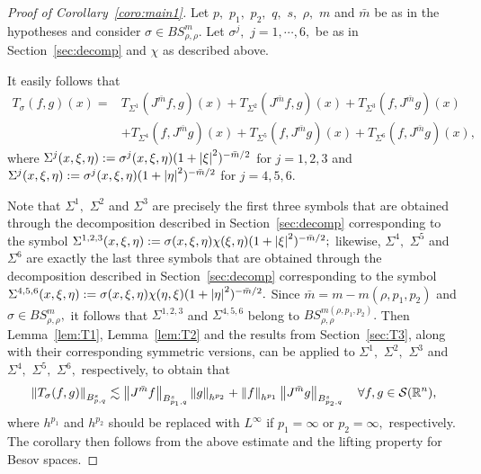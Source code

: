\begin{proof}[Proof of Corollary~\ref{coro:main1}]
 Let $p,$ $p_1,$ $p_2,$ $q,$ $s,$ $\rho,$ $m$  and $\bar{m}$ be as in the hypotheses and consider $\sigma\in BS^m_{\rho,\rho}.$  Let $\sigma^j,$ $j=1,\cdots,6,$  be as in Section~\ref{sec:decomp} and $\chi$ as described above. 

It easily follows that
\begin{align*}
T_{\sigma}(f,g)(x)=&T_{\Sigma^1}(J^{\bar{m}}f, g)(x) +T_{\Sigma^2} (J^{\bar{m}}f, g)(x) + T_{\Sigma^3}(f,J^{\bar{m}}g)(x)\\ &+T_{\Sigma^4} (f, J^{\bar{m}}g)(x)+T_{\Sigma^5} (f, J^{\bar{m}}g)(x)+T_{\Sigma^6} (f, J^{\bar{m}}g)(x), 
\end{align*}
where $\Sigma^j(x,\xi,\eta):=\sigma^j(x,\xi,\eta)(1+\left\vert \xi \right\vert^2)^{-\bar{m}/2}$ for $j=1,2,3$ and  $\Sigma^j(x,\xi,\eta):=\sigma^j(x,\xi,\eta)(1+\left\vert \eta \right\vert^2)^{-\bar{m}/2}$ for $j=4,5,6.$

 Note that $\Sigma^1,$ $\Sigma^2$ and $\Sigma^3$ are precisely  the first three symbols that are obtained through the decomposition described in Section~\ref{sec:decomp} corresponding to the symbol $\Sigma^{1,2,3}(x,\xi,\eta):=\sigma(x,\xi,\eta)\chi(\xi,\eta)(1+\left\vert \xi \right\vert^2)^{-\bar{m}/2};$ likewise, $\Sigma^4,$  $\Sigma^5$ and $\Sigma^6$  are exactly the last three symbols that are obtained through the decomposition described in Section~\ref{sec:decomp} corresponding to the symbol $\Sigma^{4,5,6}(x,\xi,\eta):=\sigma(x,\xi,\eta)\chi(\eta,\xi)(1+\left\vert \eta \right\vert^2)^{-\bar{m}/2}.$  Since $\bar{m}=m-m(\rho,p_1,p_2)$ and $\sigma\in BS^m_{\rho,\rho},$ it follows that  $\Sigma^{1,2,3}$ and $\Sigma^{4,5,6}$ belong to $BS^{m(\rho,p_1,p_2)}_{\rho,\rho}.$ Then Lemma~\ref{lem:T1}, Lemma~\ref{lem:T2} and the results from Section~\ref{sec:T3}, along with their corresponding symmetric versions, can be applied to $\Sigma^1,$ $\Sigma^2,$ $\Sigma^3$ and $\Sigma^4,$ $\Sigma^5,$ $\Sigma^6,$ respectively, to obtain that 
\[
\left\|T_\sigma(f,g)\right\|_{B^s_{p,q}}\lesssim \left\|J^{\bar{m}}f\right\|_{B^s_{p_1,q}}\left\|g\right\|_{h^{p_2}}+\left\|f\right\|_{h^{p_1}}\left\|J^{\bar{m}}g\right\|_{B^s_{p_2,q}}\quad \forall f,g\in {\mathcal{S}}({{\mathbb R}^n}),
\]
where $h^{p_1}$ and $h^{p_2}$ should be replaced with $L^\infty$ if $p_1=\infty$  or $p_2=\infty,$ respectively. The corollary then follows from the above estimate and  the lifting property  for Besov spaces.
\end{proof}



